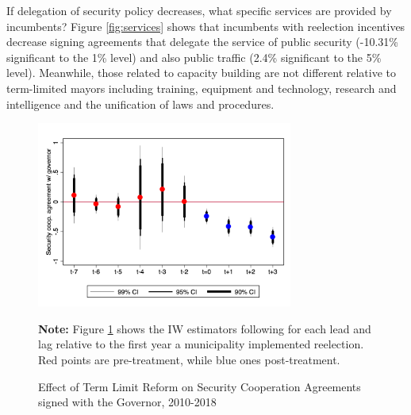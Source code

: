 \documentclass[12pt]{amsart}
\numberwithin{equation}{section}
\theoremstyle{definition}
\theoremstyle{definition}
\theoremstyle{definition}
\begin{document}
     
If delegation of security policy decreases, what specific services are provided by incumbents? Figure \ref{fig:services} shows that incumbents with reelection incentives decrease signing agreements that delegate the service of public security (-10.31\% significant to the 1\% level) and also public traffic (2.4\% significant to the 5\% level). Meanwhile, those related to capacity building are not different relative to term-limited mayors including training, equipment and technology, research and intelligence and the unification of laws and procedures. 

\begin{figure}[h] 
\centering
 \caption{Effect of Term Limit Reform on Security Cooperation Agreements signed with the Governor, 2010-2018}
 \label{fig:event_study_agreements}
\includegraphics[width=0.75\textwidth]{../Figures/catts_agreements.png}
       \captionsetup{justification=centering}
       
 \textbf{Note:} Figure \ref{fig:event_study_agreements} shows the IW estimators following \citet{abraham_sun_2020} for each lead and lag relative to the first year a municipality implemented reelection. Red points are pre-treatment, while blue ones post-treatment. 
  
\end{figure}   
\end{document}
